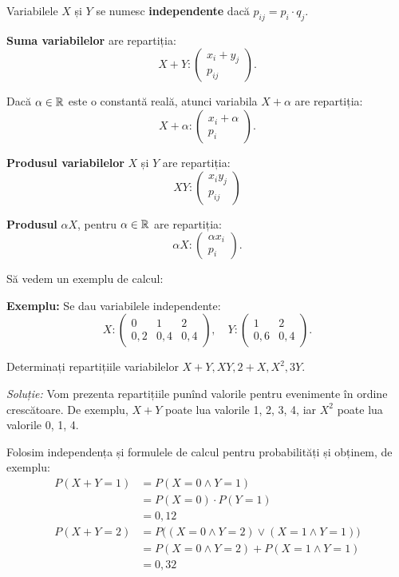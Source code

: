 Variabilele $ X $ și $ Y $ se numesc \textbf{independente} dacă $ p_{ij} = p_i \cdot q_j $.

\textbf{Suma variabilelor} are repartiția:
\[
  X + Y : \begin{pmatrix} x_i + y_j \\ p_{ij} \end{pmatrix}.
\]

Dacă $ \alpha \in \mathbb{R} $ este o constantă reală, atunci variabila $ X + \alpha $ are repartiția:
\[
  X + \alpha : \begin{pmatrix} x_i + \alpha \\ p_i \end{pmatrix}.
\]

\textbf{Produsul variabilelor} $ X $ și $ Y $ are repartiția:
\[
  XY : \begin{pmatrix} x_iy_j \\ p_{ij} \end{pmatrix}
\]

\textbf{Produsul} $ \alpha X $, pentru $ \alpha \in \mathbb{R} $ are repartiția:
\[
  \alpha X : \begin{pmatrix} \alpha x_i \\ p_i \end{pmatrix}.
\]

\vspace{0.3cm}

Să vedem un exemplu de calcul:

\textbf{Exemplu:} Se dau variabilele independente:
\[
  X : %
  \begin{pmatrix}
    0 & 1 & 2 \\
    0,2 & 0,4 & 0,4
  \end{pmatrix}, \quad %
  Y : %
  \begin{pmatrix}
    1 & 2 \\
    0,6 & 0,4
  \end{pmatrix}.
\]

Determinați repartițiile variabilelor $ X + Y, XY, 2 + X, X^2, 3Y $.

\emph{Soluție:} Vom prezenta repartițiile punînd valorile pentru evenimente
în ordine crescătoare. De exemplu, $ X + Y $ poate lua valorile 1, 2, 3, 4,
iar $ X^2 $ poate lua valorile 0, 1, 4.

Folosim independența și formulele de calcul pentru probabilități și obținem,
de exemplu:
\begin{align*}
  P(X + Y = 1) &= P(X = 0 \land Y = 1) \\
               &= P(X = 0) \cdot P(Y = 1) \\
               &= 0,12 \\
  P(X + Y = 2) &= P\Big((X = 0 \land Y = 2) \lor (X = 1 \land Y = 1)\Big) \\
               &= P(X = 0 \land Y = 2) + P(X = 1 \land Y = 1) \\
               &= 0,32
\end{align*}

